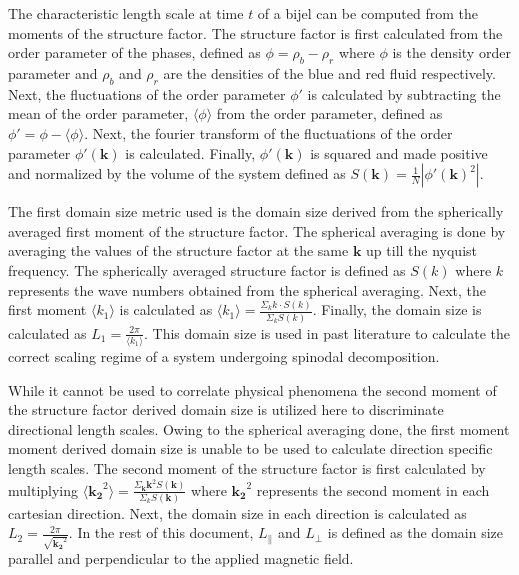 The characteristic length scale at time $t$ of a bijel can be computed from the moments of the structure factor. The 
structure factor is first calculated from the order parameter of the phases, defined as $\phi = \rho_b - \rho_r$ where 
$\phi$ is the density order parameter and $\rho_b$ and $\rho_r$ are the densities of the blue and red fluid respectively. 
Next, the fluctuations of the order parameter $\phi'$ is calculated by subtracting the mean of the order parameter, 
$\langle \phi \rangle$ from the order parameter, defined as $\phi' = \phi - \langle \phi \rangle$. Next, the fourier 
transform of the fluctuations of the order parameter $\phi'(\mathbf{k})$ is calculated. Finally, $\phi'(\mathbf{k})$ 
is squared and made positive and normalized by the volume of the system defined as 
$S(\mathbf{k}) = \frac{1}{N} |\phi'(\mathbf{k})^2|$.

The first domain size metric used is the domain size derived from the spherically averaged first moment of the structure 
factor. The spherical averaging is done by averaging the values of the structure factor at the same $\mathbf{k}$ up 
till the nyquist frequency. The spherically averaged structure factor is defined as $S(k)$ where $k$ represents the 
wave numbers obtained from the spherical averaging. Next, the first moment $\langle k_1 \rangle$ is calculated as 
$\langle k_1 \rangle = \frac{\Sigma_{k} k\cdot S(k)}{\Sigma_{k} S(k)}$. Finally, the domain size is calculated as 
$L_1 = \frac{2 \pi}{\langle k_1 \rangle}$. \cite{kendon_inertial_2001,kendon_3d_1999} This domain size is used in past literature 
to calculate the correct scaling regime of a system undergoing spinodal decomposition. 

While it cannot be used to correlate physical phenomena the second moment of the structure factor derived domain 
size is utilized here to discriminate directional length scales. Owing to the spherical averaging done, the first 
moment moment derived domain size is unable to be used to calculate direction specific length scales. The second 
moment of the structure factor is first calculated by multiplying 
$\langle \mathbf{k_2}^2 \rangle = \frac{\Sigma_{\mathbf{k}} \mathbf{k}^2 S(\mathbf{k})}{\Sigma_k S(\mathbf{k})}$ 
where $\mathbf{k_2}^2$ represents the second moment in each cartesian direction. Next, the domain size in each 
direction is calculated as $L_2 = \frac{2 \pi}{\sqrt{\mathbf{k_2}^2}}$. \cite{jansen_bijels_2011, gunther_timescales_2014} 
In the rest of this document, $L_{\parallel}$ and $L_{\perp}$ is defined as the domain size parallel and perpendicular to 
the applied magnetic field.

